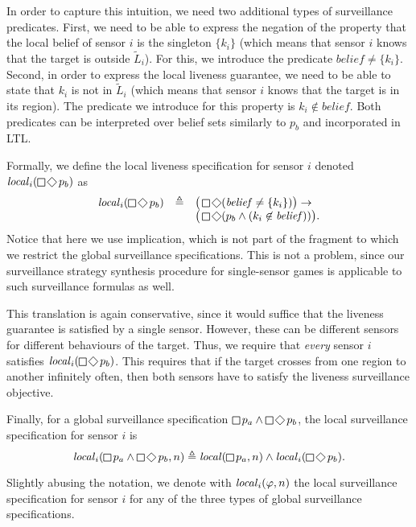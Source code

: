 In order to capture this intuition, we need two additional types of surveillance predicates. First, we need to be able to express the negation of the property that the local belief of sensor $i$ is the singleton $\{k_i\}$ (which means that sensor $i$ knows that the target is outside $\widetilde L_i$). For this, we introduce the predicate $\mathit{belief} \neq \{k_i\}$. Second, in order to express the local liveness guarantee, we need to be able to state that $k_i$ is not in $\widetilde L_i$ (which means that sensor $i$ knows that the target is in its region). The predicate we introduce for this property is $k_i \not\in\mathit{belief}$. Both predicates can be interpreted over belief sets similarly to $p_b$ and incorporated in LTL.
 
Formally, we define the local liveness specification for sensor $i$ denoted $\locspec_i(\LTLglobally\LTLfinally p_b)$ as
\[
\begin{array}{lll}
\locspec_i(\LTLglobally\LTLfinally p_b) & \triangleq &
\big(\LTLglobally\LTLfinally (\mathit{belief} \neq \{k_i\} )\big)\rightarrow\\&& \big(\LTLglobally\LTLfinally (p_b \wedge (k_i \not\in\mathit{belief}))\big).
\end{array}
\]
Notice that here we use implication, which is not part of the fragment to which we restrict the global surveillance specifications. This is not a problem, since our surveillance strategy synthesis procedure for single-sensor games is applicable to such surveillance formulas as well.

This translation is again conservative, since it would suffice that the liveness guarantee is satisfied by a single sensor. However, these can be different sensors for different behaviours of the target. Thus, we require that \emph{every} sensor $i$ satisfies $\locspec_i(\LTLglobally\LTLfinally p_b)$. This requires that if the target crosses from one region to another infinitely often, then both sensors have to satisfy the liveness surveillance objective.

Finally, for a global surveillance specification $\LTLglobally p_a \wedge \LTLglobally\LTLfinally p_b$, the local surveillance specification for sensor $i$ is
\[\locspec_i(\LTLglobally p_a\wedge  \LTLglobally\LTLfinally p_b,n)\triangleq
\locspec(\LTLglobally p_a,n) \wedge\locspec_i(\LTLglobally\LTLfinally p_b) .
\]

Slightly abusing the notation, we denote with $\mathit{local}_i(\varphi,n)$ the local surveillance specification for sensor $i$ for any of the three types of global surveillance specifications.

